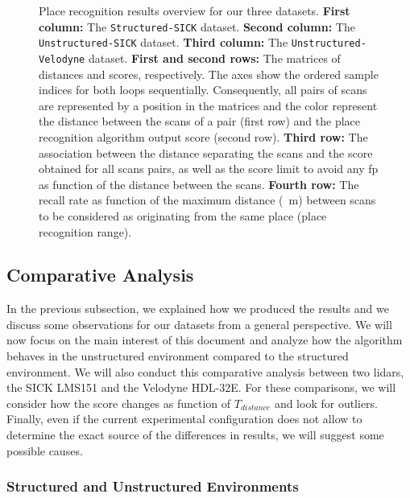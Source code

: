 \begin{figure}[H]
    \caption[Place recognition results overview for our three datasets.]{ Place recognition results overview for our three datasets. \textbf{First column:} The \texttt{Structured-SICK} dataset. \textbf{Second column:} The \texttt{Unstructured-SICK} dataset. \textbf{Third column:} The \texttt{Unstructured-Velodyne} dataset. \textbf{First and second rows:} The matrices of distances and scores, respectively. The axes show the ordered sample indices for both loops sequentially. Consequently, all pairs of scans are represented by a position in the matrices and the color represent the distance between the scans of a pair (first row) and the place recognition algorithm output score (second row). \textbf{Third row:} The association between the distance separating the scans and the score obtained for all scans pairs, as well as the score limit to avoid any \gls*{fp} as function of the distance between the scans. \textbf{Fourth row:} The recall rate as function of the maximum distance (\SI{}{\meter}) between scans to be considered as originating from the same place (place recognition range).} 
    \label{fig:chap_slam_results}
\end{figure}

\subsection{Comparative Analysis}
\label{ssec:chap_slam_comparative_analysis}

In the previous subsection, we explained how we produced the results and we discuss some observations for our datasets from a general perspective. We will now focus on the main interest of this document and analyze how the algorithm behaves in the unstructured environment compared to the structured environment. We will also conduct this comparative analysis between two \gls*{lidar}s, the SICK LMS151 and the Velodyne HDL-32E. For these comparisons, we will consider how the score changes as function of $T_{distance}$ and look for outliers. Finally, even if the current experimental configuration does not allow to determine the exact source of the differences in results, we will suggest some possible causes.


\subsubsection{Structured and Unstructured Environments}
\label{ssec:chap_slam_struct_vs_forest}

